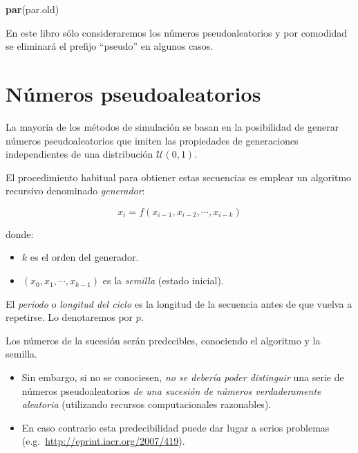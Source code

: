 \documentclass[
]{book}
\newenvironment{Shaded}{\begin{snugshade}}{\end{snugshade}}
\newcommand{\KeywordTok}[1]{\textcolor[rgb]{0.13,0.29,0.53}{\textbf{#1}}}
\newcommand{\NormalTok}[1]{#1}
\theoremstyle{break}
\theoremstyle{definition}
\theoremstyle{definition}
\theoremstyle{definition}
\theoremstyle{remark}
\begin{document}
\begin{Shaded}
\begin{Highlighting}[]
\KeywordTok{par}\NormalTok{(par.old)}
\end{Highlighting}
\end{Shaded}

En este libro sólo consideraremos los números pseudoaleatorios y por comodidad se eliminará el prefijo ``pseudo'' en algunos casos.

\hypertarget{nuxfameros-pseudoaleatorios}{%
\section{Números pseudoaleatorios}\label{nuxfameros-pseudoaleatorios}}

La mayoría de los métodos de simulación se basan en la posibilidad de generar números pseudoaleatorios que imiten las propiedades de generaciones independientes de una distribución \(\mathcal{U}(0,1)\).

El procedimiento habitual para obtiener estas secuencias es emplear un algoritmo recursivo denominado \emph{generador}:

\[x_{i} = f\left( x_{i-1}, x_{i-2}, \cdots, x_{i-k}\right)\]

donde:

\begin{itemize}
\item
  \(k\) es el orden del generador.
\item
  \(\left( x_{0},x_{1},\cdots,x_{k-1}\right)\) es la \emph{semilla}
  (estado inicial).
\end{itemize}

El \emph{periodo} o \emph{longitud del ciclo} es la longitud de la secuencia antes de que vuelva a repetirse. Lo denotaremos por \(p\).

Los números de la sucesión serán predecibles, conociendo el algoritmo y la semilla.

\begin{itemize}
\item
  Sin embargo, si no se conociesen, \emph{no se debería poder distinguir} una serie de números pseudoaleatorios \emph{de una sucesión de números verdaderamente aleatoria} (utilizando recursos computacionales razonables).
\item
  En caso contrario esta predecibilidad puede dar lugar a serios
  problemas (e.g.~\url{http://eprint.iacr.org/2007/419}).
\end{itemize}
\end{document}
